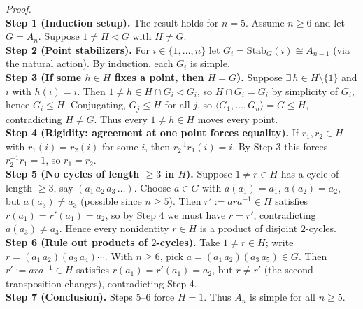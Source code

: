 \documentclass[12pt]{article}
\theoremstyle{definition}
\begin{document}
\emph{Proof.}\\
\textbf{Step 1 (Induction setup).} The result holds for $n=5$. Assume $n\ge 6$ and let $G=A_n$. Suppose $1\ne H\lhd G$ with $H\ne G$.\\
\textbf{Step 2 (Point stabilizers).} For $i\in\{1,\dots,n\}$ let $G_i=\mathrm{Stab}_G(i)\cong A_{n-1}$ (via the natural action). By induction, each $G_i$ is simple.\\
\textbf{Step 3 (If some $h\in H$ fixes a point, then $H=G$).} Suppose $\exists\,h\in H\setminus\{1\}$ and $i$ with $h(i)=i$. Then $1\ne h\in H\cap G_i\lhd G_i$, so $H\cap G_i=G_i$ by simplicity of $G_i$, hence $G_i\le H$. Conjugating, $G_j\le H$ for all $j$, so $\langle G_1,\dots,G_n\rangle=G\le H$, contradicting $H\ne G$. Thus every $1\ne h\in H$ moves every point.\\
\textbf{Step 4 (Rigidity: agreement at one point forces equality).} If $r_1,r_2\in H$ with $r_1(i)=r_2(i)$ for some $i$, then $r_2^{-1}r_1(i)=i$. By Step 3 this forces $r_2^{-1}r_1=1$, so $r_1=r_2$.\\
\textbf{Step 5 (No cycles of length $\ge 3$ in $H$).} Suppose $1\ne r\in H$ has a cycle of length $\ge 3$, say $(a_1\,a_2\,a_3\,\dots)$. Choose $a\in G$ with $a(a_1)=a_1$, $a(a_2)=a_2$, but $a(a_3)\ne a_3$ (possible since $n\ge 5$). Then $r' := a r a^{-1}\in H$ satisfies $r(a_1)=r'(a_1)=a_2$, so by Step 4 we must have $r=r'$, contradicting $a(a_3)\ne a_3$. Hence every nonidentity $r\in H$ is a product of disjoint $2$-cycles.\\
\textbf{Step 6 (Rule out products of $2$-cycles).} Take $1\ne r\in H$; write $r=(a_1\,a_2)(a_3\,a_4)\cdots$. With $n\ge 6$, pick $a=(a_1\,a_2)(a_3\,a_5)\in G$. Then $r' := a r a^{-1}\in H$ satisfies $r(a_1)=r'(a_1)=a_2$, but $r\ne r'$ (the second transposition changes), contradicting Step 4.\\
\textbf{Step 7 (Conclusion).} Steps 5–6 force $H=1$. Thus $A_n$ is simple for all $n\ge 5$.\\
\end{document}
